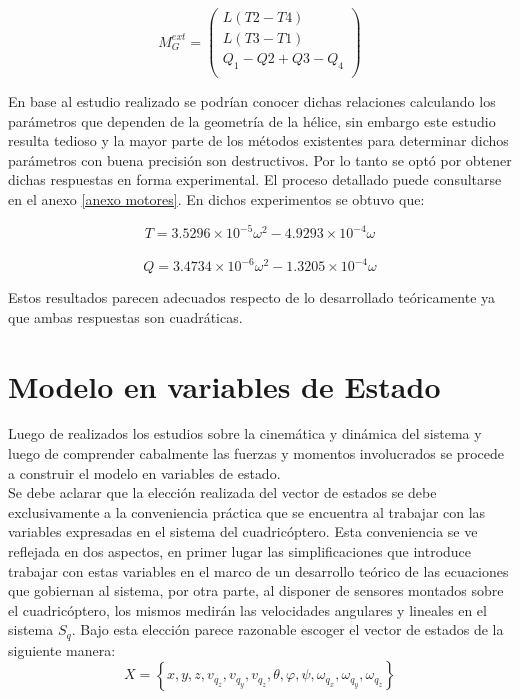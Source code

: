 \documentclass[main]{subfiles}
\begin{document}
$$M_G^{ext} = \left(\begin{array}{c}
L(T2-T4)\\
L(T3-T1)\\
Q_1-Q2+Q3-Q_4\\
\end{array} \right)$$

En base al estudio realizado se podr\'ian conocer dichas relaciones calculando los par\'ametros que dependen de la geometr\'ia de la h\'elice, sin embargo este estudio resulta tedioso y la mayor parte de los m\'etodos existentes para determinar dichos par\'ametros con buena precisi\'on son destructivos. Por lo tanto se opt\'o por obtener dichas respuestas en forma experimental. El proceso detallado puede consultarse en el anexo \ref{anexo motores}. En dichos experimentos se obtuvo que:

$$
T=3.5296\times 10^{-5}\omega^2-4.9293\times 10^{-4}\omega
$$\\$$Q= 3.4734\times 10^{-6}\omega^2-1.3205\times 10^{-4}\omega $$

Estos resultados parecen adecuados respecto de lo desarrollado te\'oricamente ya que ambas respuestas son cuadr\'aticas. 

\section{Modelo en variables de Estado}

Luego de realizados los estudios sobre la cinem\'atica y din\'amica del sistema y luego de comprender cabalmente las fuerzas y momentos involucrados se procede a construir el modelo en variables de estado.\\ 

Se debe aclarar que la elecci\'on realizada del vector de estados se debe exclusivamente a la conveniencia pr\'actica que se encuentra al trabajar con las variables expresadas en el sistema del cuadric\'optero. Esta conveniencia se ve reflejada en dos aspectos, en primer lugar las simplificaciones que introduce trabajar con estas variables en el marco de un desarrollo te\'orico de las ecuaciones que gobiernan al sistema, por otra parte, al disponer de sensores montados sobre el cuadric\'optero, los mismos medir\'an las velocidades angulares y lineales en el sistema $S_q$. Bajo esta elecci\'on parece razonable escoger el vector de estados de la siguiente manera:
$$X=\left\lbrace  x,y,z, v_{q_z},v_{q_y},v_{q_z},\theta,\varphi,\psi,\omega_{q_x},\omega_{q_y},\omega_{q_z} \right\rbrace$$
\end{document}

